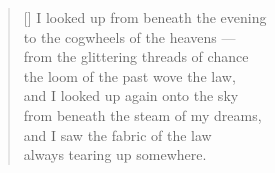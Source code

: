 \documentclass[a4paper,12pt,twoside,final]{book}
\begin{document}
\settowidth{\versewidth}{from under the steam of my dreams,}

\begin{verse}[\versewidth]
  I looked up from beneath the evening \\
  to the cogwheels of the heavens --- \\
  from the glittering threads of chance \\
  the loom of the past wove the law, \\
  and I looked up again onto the sky \\
  from beneath the steam of my dreams, \\
  and I saw the fabric of the law \\
  always tearing up somewhere.
\end{verse}


\newpage

\settowidth{\versewidth}{törvényt szőtt a mult szövőszéke}
\end{document}
